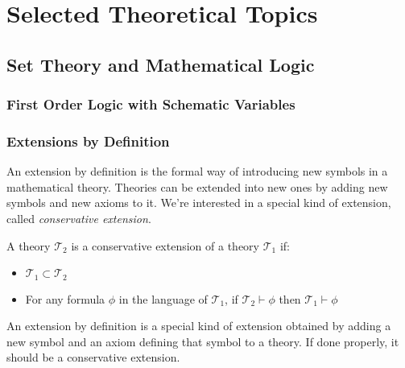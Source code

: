 \chapter{Selected Theoretical Topics}
\label{part:theory}

\section{Set Theory and Mathematical Logic}
\subsection{First Order Logic with Schematic Variables}
\label{sec:theoryfol}
\subsection{Extensions by Definition}
\label{sec:definitions}

An extension by definition is the formal way of introducing new symbols in a mathematical theory.
Theories can be extended into new ones by adding new symbols and new axioms to it. We're interested in a special kind of extension, called \textit{conservative extension}.
\begin{definition}

    A theory $\mathcal{T}_2$ is a conservative extension of a theory $\mathcal{T}_1$ if:
    \begin{itemize}
        \item $\mathcal{T}_1 \subset \mathcal{T}_2$
        \item For any formula $\phi$ in the language of $\mathcal{T}_1$, if $\mathcal{T}_2 \vdash 		\phi$ then $\mathcal{T}_1 \vdash \phi$
    \end{itemize}
\end{definition}

An extension by definition is a special kind of extension obtained by adding a new symbol and an axiom defining that symbol to a theory. If done properly, it should be a conservative extension.

